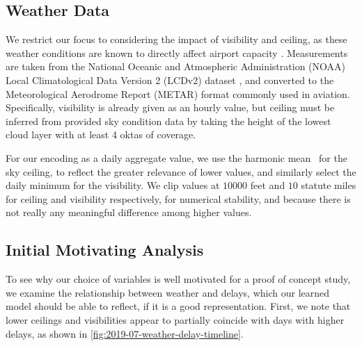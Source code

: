 \subsection{Weather Data}
We restrict our focus to considering the impact of visibility and ceiling, as these weather conditions are known to directly affect airport capacity \cite{2014lga}. Measurements are taken from the National Oceanic and Atmospheric Administration (NOAA) Local Climatological Data Version 2 (LCDv2) dataset \cite{weatherdata}, and converted to the Meteorological Aerodrome Report (METAR) format commonly used in aviation. Specifically, visibility is already given as an hourly value, but ceiling must be inferred from provided sky condition data by taking the height of the lowest cloud layer with at least 4 oktas of coverage.

For our encoding as a daily aggregate value, we use the harmonic mean~\cite{ferger1931nature} for the sky ceiling, to reflect the greater relevance of lower values, and similarly select the daily minimum for the visibility. We clip values at $10000$ feet and $10$ statute miles for ceiling and visibility respectively, for numerical stability, and because there is not really any meaningful difference among higher values.


\subsection{Initial Motivating Analysis}

To see why our choice of variables is well motivated for a proof of concept study, we examine the relationship between weather and delays, which our learned model should be able to reflect, if it is a good representation. First, we note that lower ceilings and visibilities appear to partially coincide with days with higher delays, as shown in \cref{fig:2019-07-weather-delay-timeline}.

